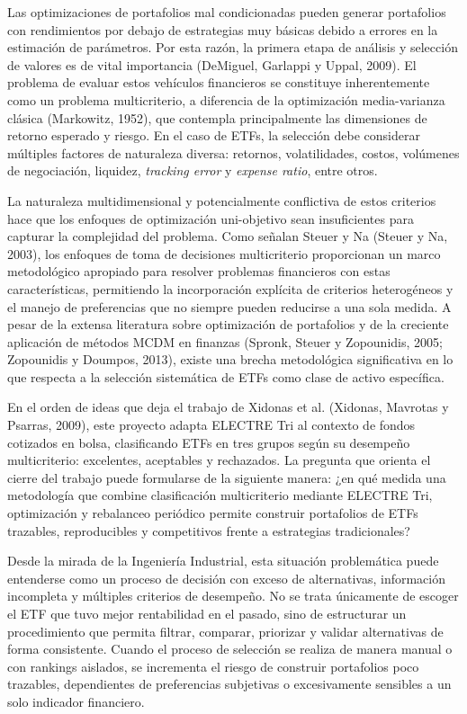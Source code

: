 \documentclass[12pt,letterpaper]{article}
\begin{document}
Las optimizaciones de portafolios mal condicionadas pueden generar portafolios con rendimientos por debajo de estrategias muy básicas debido a errores en la estimación de parámetros. Por esta razón, la primera etapa de análisis y selección de valores es de vital importancia (DeMiguel, Garlappi y Uppal, 2009). El problema de evaluar estos vehículos financieros se constituye inherentemente como un problema multicriterio, a diferencia de la optimización media-varianza clásica (Markowitz, 1952), que contempla principalmente las dimensiones de retorno esperado y riesgo. En el caso de ETFs, la selección debe considerar múltiples factores de naturaleza diversa: retornos, volatilidades, costos, volúmenes de negociación, liquidez, \textit{tracking error} y \textit{expense ratio}, entre otros.

La naturaleza multidimensional y potencialmente conflictiva de estos criterios hace que los enfoques de optimización uni-objetivo sean insuficientes para capturar la complejidad del problema. Como señalan Steuer y Na (Steuer y Na, 2003), los enfoques de toma de decisiones multicriterio proporcionan un marco metodológico apropiado para resolver problemas financieros con estas características, permitiendo la incorporación explícita de criterios heterogéneos y el manejo de preferencias que no siempre pueden reducirse a una sola medida. A pesar de la extensa literatura sobre optimización de portafolios y de la creciente aplicación de métodos MCDM en finanzas (Spronk, Steuer y Zopounidis, 2005; Zopounidis y Doumpos, 2013), existe una brecha metodológica significativa en lo que respecta a la selección sistemática de ETFs como clase de activo específica.

En el orden de ideas que deja el trabajo de Xidonas et al. (Xidonas, Mavrotas y Psarras, 2009), este proyecto adapta ELECTRE Tri al contexto de fondos cotizados en bolsa, clasificando ETFs en tres grupos según su desempeño multicriterio: excelentes, aceptables y rechazados. La pregunta que orienta el cierre del trabajo puede formularse de la siguiente manera: ¿en qué medida una metodología que combine clasificación multicriterio mediante ELECTRE Tri, optimización y rebalanceo periódico permite construir portafolios de ETFs trazables, reproducibles y competitivos frente a estrategias tradicionales?



Desde la mirada de la Ingeniería Industrial, esta situación problemática puede entenderse como un proceso de decisión con exceso de alternativas, información incompleta y múltiples criterios de desempeño. No se trata únicamente de escoger el ETF que tuvo mejor rentabilidad en el pasado, sino de estructurar un procedimiento que permita filtrar, comparar, priorizar y validar alternativas de forma consistente. Cuando el proceso de selección se realiza de manera manual o con rankings aislados, se incrementa el riesgo de construir portafolios poco trazables, dependientes de preferencias subjetivas o excesivamente sensibles a un solo indicador financiero.
\end{document}

